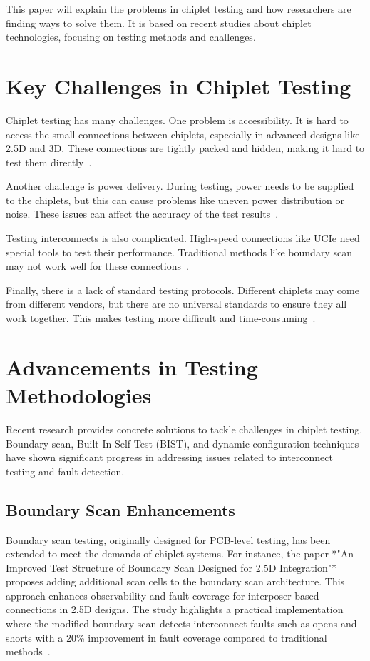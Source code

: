 \documentclass[acmtog, 12pt]{acmart}
\begin{document}
This paper will explain the problems in chiplet testing and how researchers are finding ways to solve them. It is based on recent studies about chiplet technologies, focusing on testing methods and challenges.




\section*{Key Challenges in Chiplet Testing}

Chiplet testing has many challenges. One problem is accessibility. It is hard to access the small connections between chiplets, especially in advanced designs like 2.5D and 3D. These connections are tightly packed and hidden, making it hard to test them directly~\cite{10365967}.

Another challenge is power delivery. During testing, power needs to be supplied to the chiplets, but this can cause problems like uneven power distribution or noise. These issues can affect the accuracy of the test results~\cite{9107636}.

Testing interconnects is also complicated. High-speed connections like UCIe need special tools to test their performance. Traditional methods like boundary scan may not work well for these connections~\cite{10766679}.

Finally, there is a lack of standard testing protocols. Different chiplets may come from different vendors, but there are no universal standards to ensure they all work together. This makes testing more difficult and time-consuming~\cite{9107636}.


\section*{Advancements in Testing Methodologies}

Recent research provides concrete solutions to tackle challenges in chiplet testing. Boundary scan, Built-In Self-Test (BIST), and dynamic configuration techniques have shown significant progress in addressing issues related to interconnect testing and fault detection.

\subsection*{Boundary Scan Enhancements}
Boundary scan testing, originally designed for PCB-level testing, has been extended to meet the demands of chiplet systems. For instance, the paper *"An Improved Test Structure of Boundary Scan Designed for 2.5D Integration"* proposes adding additional scan cells to the boundary scan architecture. This approach enhances observability and fault coverage for interposer-based connections in 2.5D designs. The study highlights a practical implementation where the modified boundary scan detects interconnect faults such as opens and shorts with a 20\% improvement in fault coverage compared to traditional methods~\cite{10365967}.
\end{document}
